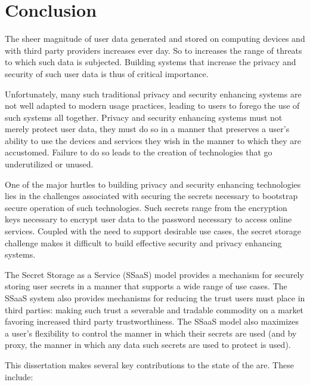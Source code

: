 \chapter{Conclusion}
\label{chap:conclusion}

The sheer magnitude of user data generated and stored on computing
devices and with third party providers increases ever day. So to
increases the range of threats to which such data is subjected.
Building systems that increase the privacy and security of such user
data is thus of critical importance.

Unfortunately, many such traditional privacy and security enhancing
systems are not well adapted to modern usage practices, leading to
users to forego the use of such systems all together. Privacy and
security enhancing systems must not merely protect user data, they
must do so in a manner that preserves a user's ability to use the
devices and services they wish in the manner to which they are
accustomed. Failure to do so leads to the creation of technologies
that go underutilized or unused.

One of the major hurtles to building privacy and security enhancing
technologies lies in the challenges associated with securing the
secrets necessary to bootstrap secure operation of such
technologies. Such secrets range from the encryption keys necessary to
encrypt user data to the password necessary to access online
services. Coupled with the need to support desirable use cases, the
secret storage challenge makes it difficult to build effective
security and privacy enhancing systems.

The Secret Storage as a Service (SSaaS) model provides a mechanism for
securely storing user secrets in a manner that supports a wide range
of use cases. The SSaaS system also provides mechanisms for reducing
the trust users must place in third parties: making such trust a
severable and tradable commodity on a market favoring increased third
party trustworthiness. The SSaaS model also maximizes a user's
flexibility to control the manner in which their secrets are used (and
by proxy, the manner in which any data such secrets are used to
protect is used).

This dissertation makes several key contributions to the state of the
are. These include:

